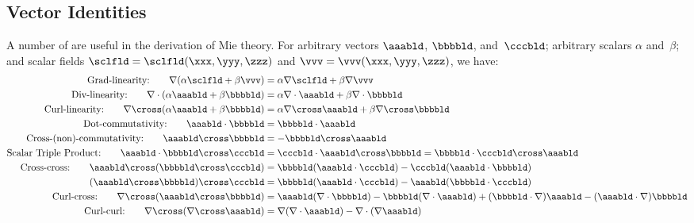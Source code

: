 \documentclass[12pt]{article}
\begin{document}
\subsection[Vector Identities]{Vector Identities}\label{sxn:vct_idn}
A number of  are useful in the derivation 
of Mie theory.
For arbitrary vectors $\aaabld$, $\bbbbld$, and~$\cccbld$; 
arbitrary scalars $\alpha$ and~$\beta$; 
and scalar fields $\sclfld = \sclfld(\xxx,\yyy,\zzz)$ 
and $\vvv = \vvv(\xxx,\yyy,\zzz)$, we have:
\begin{subequations}
\label{eqn:vct_idn}
\begin{align}
\label{eqn:vct_idn_grd_lnr}\mbox{Grad-linearity:}\qquad
\nabla (\alpha \sclfld + \beta \vvv) & = \alpha \nabla \sclfld + \beta \nabla \vvv \\
\label{eqn:vct_idn_dvr_lnr}\mbox{Div-linearity:}\qquad
\nabla \cdot (\alpha \aaabld + \beta \bbbbld) & = \alpha \nabla \cdot \aaabld + \beta \nabla \cdot \bbbbld \\
\label{eqn:vct_idn_crl_lnr}\mbox{Curl-linearity:}\qquad
\nabla \cross (\alpha \aaabld + \beta \bbbbld) & = \alpha \nabla \cross \aaabld + \beta \nabla \cross \bbbbld \\
\label{eqn:vct_idn_dot_cmm}\mbox{Dot-commutativity:}\qquad
\aaabld \cdot \bbbbld & = \bbbbld \cdot \aaabld \\
\label{eqn:vct_idn_crs_cmm}\mbox{Cross-(non)-commutativity:}\qquad
\aaabld \cross \bbbbld & = - \bbbbld \cross \aaabld \\
\label{eqn:vct_idn_trp_prd}\mbox{Scalar Triple Product:}\qquad
\aaabld \cdot \bbbbld \cross \cccbld & = 
\cccbld \cdot \aaabld \cross \bbbbld = 
\bbbbld \cdot \cccbld \cross \aaabld \\
\label{eqn:vct_idn_crs_crs}\mbox{Cross-cross:}\qquad
\aaabld \cross (\bbbbld \cross \cccbld) & = 
\bbbbld (\aaabld \cdot \cccbld) - 
\cccbld (\aaabld \cdot \bbbbld) \\
(\aaabld \cross \bbbbld) \cross \cccbld & = 
\bbbbld (\aaabld \cdot \cccbld) - 
\aaabld (\bbbbld \cdot \cccbld) \\
\label{eqn:vct_idn_crl_crs}\mbox{Curl-cross:}\qquad
\nabla \cross (\aaabld \cross \bbbbld) & = 
\aaabld (\nabla \cdot \bbbbld) - \bbbbld (\nabla \cdot \aaabld) + 
(\bbbbld \cdot \nabla) \aaabld - (\aaabld \cdot \nabla) \bbbbld \\
\label{eqn:vct_idn_crl_crl}\mbox{Curl-curl:}\qquad 
\nabla \cross (\nabla \cross \aaabld) 
& = \nabla (\nabla \cdot \aaabld) - \nabla \cdot (\nabla \aaabld) \nonumber \\

\end{align}
\end{subequations}
\end{document}
